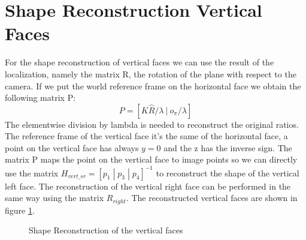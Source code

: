 \documentclass[11pt, oneside]{article}   	%
\begin{document}
\section{Shape Reconstruction Vertical Faces }
For the shape reconstruction of vertical faces we can use the result of the localization, namely the matrix R, the rotation of the plane with respect to the camera.
If we put the world reference frame on the horizontal face we obtain the following matrix P:
$$ P = [K \hat{R} / \lambda\  | \ o_\pi / \lambda] $$
The elementwise division by lambda is needed to reconstruct the original ratios.
The reference frame of the vertical face it's the same of the horizontal face, a point on the vertical face has always $y=0$ and the z has the inverse sign.
The matrix P maps the point on the vertical face to image points so we can directly use the matrix $ H_{vert\_sr} = [p_1 \; |\; p_3 \;|\; p_4]^{-1}$ to reconstruct the shape of the vertical left face.
The reconstruction of the vertical right face can be performed in the same way using the matrix $R_{right}$.
The reconstructed  vertical faces are shown in figure \ref{verticalshaperec}.

\begin{figure}
 \centering
    \qquad
    \caption{Shape Reconstruction of the vertical faces}%
    \label{verticalshaperec}%
\end{figure}
\end{document}
